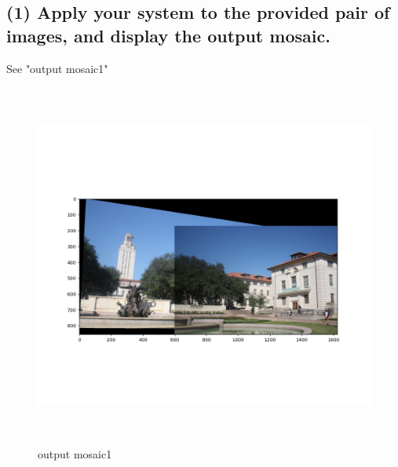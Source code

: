 \documentclass[a4paper,UTF8]{article}
\numberwithin{equation}{section}
\begin{document}
\subsection*{(1) Apply your system to the provided pair of images, and display the output mosaic.}
See "output mosaic1"
\begin{figure}[H]
	\centering  %
	\includegraphics[width=12cm,height=12cm]{result1.png}  %
	\caption{output mosaic1}  %
\end{figure}
\end{document}
